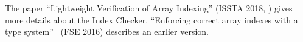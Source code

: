 
The paper ``Lightweight Verification of Array Indexing'' (ISSTA 2018,
)
gives more details about the Index Checker.
``Enforcing correct array indexes with a type system''~\cite{Santino2016} (FSE 2016) describes
an earlier version.

